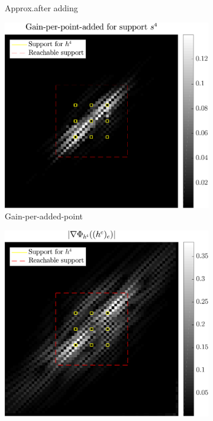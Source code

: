\begin{figure}[!ht]
\begin{subfigure}[b]{0.32\linewidth}
\caption{Approx.\@ after adding}\label{fig_beforeafter-approx_after}
\end{subfigure}
\begin{subfigure}[b]{0.32\linewidth}\centering
\includegraphics[width=\linewidth]{figures/before_after/xp_128x128_sc2_angl1_K3_S3_node4before_objmatrix.pdf}
\caption{Gain-per-added-point}\label{fig_beforeafter-gain}
\end{subfigure}
\begin{subfigure}[b]{0.32\linewidth}\centering
\includegraphics[width=\linewidth]{figures/before_after/xp_128x128_sc2_angl1_K3_S3_node4before_partgrad4.pdf}

\end{subfigure}
\end{figure}
